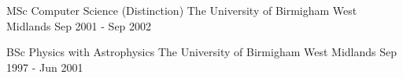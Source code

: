 

\begin{cventries}

  \cventry
    {MSc Computer Science (Distinction)} %
    {The University of Birmigham} %
    {West Midlands} %
    {Sep 2001 - Sep 2002} %
    {
      \begin{cvitems} %
      \end{cvitems}
    }

  \cventry
    {BSc Physics with Astrophysics} %
    {The University of Birmigham} %
    {West Midlands} %
    {Sep 1997 - Jun 2001} %
    {
      \begin{cvitems} %
      \end{cvitems}
    }

\end{cventries}

